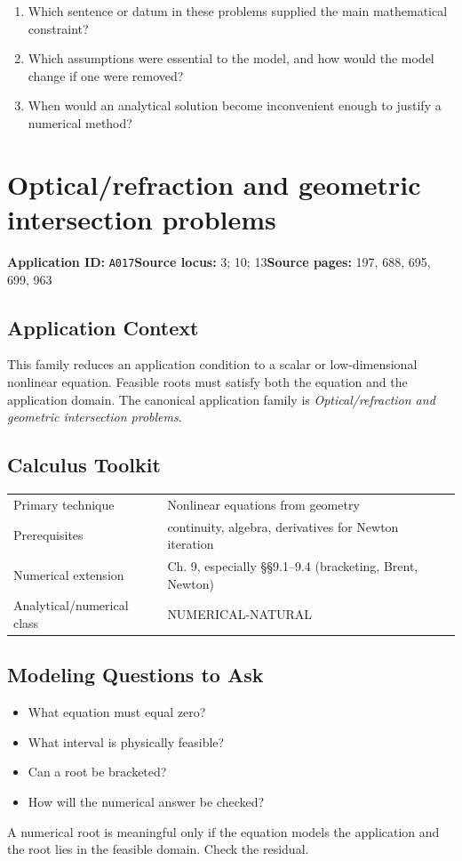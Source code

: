 \documentclass[11pt]{book}
\newcommand{\pid}[1]{\texttt{#1}}
\begin{document}
\begin{reflectionbox}\begin{enumerate}
\item Which sentence or datum in these problems supplied the main mathematical constraint?
\item Which assumptions were essential to the model, and how would the model change if one were removed?
\item When would an analytical solution become inconvenient enough to justify a numerical method?
\end{enumerate}\end{reflectionbox}
\chapter{Optical/refraction and geometric intersection problems}\label{app:A017}
\textbf{Application ID:} \pid{A017}\quad \textbf{Source locus:} 3; 10; 13\quad \textbf{Source pages:} 197, 688, 695, 699, 963
\section*{Application Context}
This family reduces an application condition to a scalar or low-dimensional nonlinear equation. Feasible roots must satisfy both the equation and the application domain. The canonical application family is \emph{Optical/refraction and geometric intersection problems}.
\section*{Calculus Toolkit}
\begin{tabularx}{\textwidth}{@{}lX@{}}\toprule
Primary technique & Nonlinear equations from geometry \\
Prerequisites & continuity, algebra, derivatives for Newton iteration \\
Numerical extension & Ch. 9, especially §§9.1–9.4 (bracketing, Brent, Newton) \\
Analytical/numerical class & NUMERICAL-NATURAL \\
\bottomrule\end{tabularx}
\section*{Modeling Questions to Ask}\begin{itemize}
\item What equation must equal zero?
\item What interval is physically feasible?
\item Can a root be bracketed?
\item How will the numerical answer be checked?
\end{itemize}
\begin{errorbox}A numerical root is meaningful only if the equation models the application and the root lies in the feasible domain. Check the residual.\end{errorbox}
\end{document}
